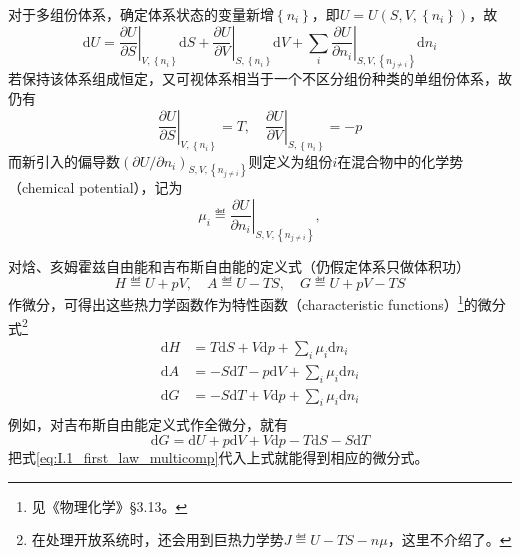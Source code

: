 \documentclass[main.tex]{subfiles}
\begin{document}
对于多组份体系，确定体系状态的变量新增$\left\{n_i\right\}$，即$U=U\left(S,V,\left\{n_i\right\}\right)$，故
\begin{equation}\label{eq:I.1_first_law_multicomp}
    \mathrm{d}U=\left.\frac{\partial U}{\partial S}\right|_{V,\left\{n_i\right\}}\mathrm{d}S+\left.\frac{\partial U}{\partial V}\right|_{S,\left\{n_i\right\}}\mathrm{d}V+\sum_i\left.\frac{\partial U}{\partial n_i}\right|_{S,V,\left\{n_{j\neq i}\right\}}\mathrm{d}n_i
\end{equation}
若保持该体系组成恒定，又可视体系相当于一个不区分组份种类的单组份体系，故仍有
\[\left.\frac{\partial U}{\partial S}\right|_{V,\left\{n_i\right\}}=T,\quad\left.\frac{\partial U}{\partial V}\right|_{S,\left\{n_i\right\}}=-p\]
而新引入的偏导数$\left(\partial U/\partial n_i\right)_{S,V,\left\{n_{j\neq i}\right\}}$则定义为组份$i$在混合物中的化学势（chemical potential），记为
\[\mu_i\eqdef\left.\frac{\partial U}{\partial n_i}\right|_{S,V,\left\{n_{j\neq i}\right\}},\]

对焓、亥姆霍兹自由能和吉布斯自由能的定义式（仍假定体系只做体积功）
\[H\eqdef U+pV,\quad A\eqdef U-TS,\quad G\eqdef U+pV-TS\]
作微分，可得出这些热力学函数作为特性函数（characteristic functions）\footnote{见《物理化学》\S 3.13。}的微分式\footnote{在处理开放系统时，还会用到巨热力学势$J\eqdef U-TS-n\mu$，这里不介绍了。}
\begin{align}
    \mathrm{d}H & = T\mathrm{d}S+V\mathrm{d}p+\sum_i\mu_i\mathrm{d}n_i\label{eq:I.1_dH} \\
    \mathrm{d}A & =-S\mathrm{d}T-p\mathrm{d}V+\sum_i\mu_i\mathrm{d}n_i\label{eq:I.1_dA} \\
    \mathrm{d}G & =-S\mathrm{d}T+V\mathrm{d}p+\sum_i\mu_i\mathrm{d}n_i\label{eq:I.1_dG} \\
\end{align}
例如，对吉布斯自由能定义式作全微分，就有
\[\mathrm{d}G=\mathrm{d}U+p\mathrm{d}V+V\mathrm{d}p-T\mathrm{d}S-S\mathrm{d}T\]
把式\eqref{eq:I.1_first_law_multicomp}代入上式就能得到相应的微分式。
\end{document}
